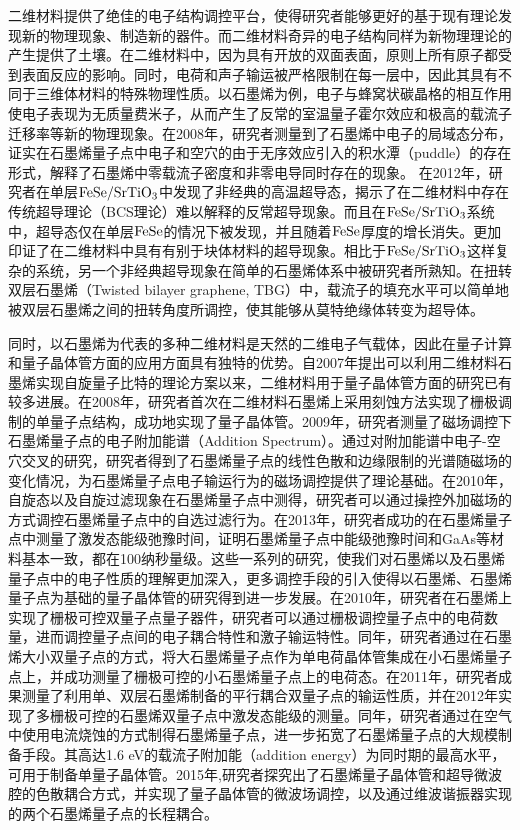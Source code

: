 二维材料提供了绝佳的电子结构调控平台，使得研究者能够更好的基于现有理论发现新的物理现象、制造新的器件。而二维材料奇异的电子结构同样为新物理理论的产生提供了土壤。在二维材料中，因为具有开放的双面表面，原则上所有原子都受到表面反应的影响。同时，电荷和声子输运被严格限制在每一层中，因此其具有不同于三维体材料的特殊物理性质。以石墨烯为例，电子与蜂窝状碳晶格的相互作用使电子表现为无质量费米子，从而产生了反常的室温量子霍尔效应和极高的载流子迁移率等新的物理现象。在2008年，研究者测量到了石墨烯中电子的局域态分布，证实在石墨烯量子点中电子和空穴的由于无序效应引入的积水潭（puddle）的存在形式，解释了石墨烯中零载流子密度和非零电导同时存在的现象。%
在2012年，研究者在单层$\rm{FeSe/SrTiO_{3}}$中发现了非经典的高温超导态，揭示了在二维材料中存在传统超导理论（BCS理论）难以解释的反常超导现象。而且在$\rm{FeSe/SrTiO_{3}}$系统中，超导态仅在单层$\rm{FeSe}$的情况下被发现，并且随着$\rm{FeSe}$厚度的增长消失。更加印证了在二维材料中具有有别于块体材料的超导现象。相比于$\rm{FeSe/SrTiO_{3}}$这样复杂的系统，另一个非经典超导现象在简单的石墨烯体系中被研究者所熟知。在扭转双层石墨烯（Twisted bilayer graphene, TBG）中，载流子的填充水平可以简单地被双层石墨烯之间的扭转角度所调控，使其能够从莫特绝缘体转变为超导体。

同时，以石墨烯为代表的多种二维材料是天然的二维电子气载体，因此在量子计算和量子晶体管方面的应用方面具有独特的优势。自2007年提出可以利用二维材料石墨烯实现自旋量子比特的理论方案以来，二维材料用于量子晶体管方面的研究已有较多进展。在2008年，研究者首次在二维材料石墨烯上采用刻蚀方法实现了栅极调制的单量子点结构，成功地实现了量子晶体管。2009年，研究者测量了磁场调控下石墨烯量子点的电子附加能谱（Addition Spectrum）。通过对附加能谱中电子-空穴交叉的研究，研究者得到了石墨烯量子点的线性色散和边缘限制的光谱随磁场的变化情况，为石墨烯量子点电子输运行为的磁场调控提供了理论基础。在2010年，自旋态以及自旋过滤现象在石墨烯量子点中测得，研究者可以通过操控外加磁场的方式调控石墨烯量子点中的自选过滤行为。在2013年，研究者成功的在石墨烯量子点中测量了激发态能级弛豫时间，证明石墨烯量子点中能级弛豫时间和GaAs等材料基本一致，都在100纳秒量级。这些一系列的研究，使我们对石墨烯以及石墨烯量子点中的电子性质的理解更加深入，更多调控手段的引入使得以石墨烯、石墨烯量子点为基础的量子晶体管的研究得到进一步发展。在2010年，研究者在石墨烯上实现了栅极可控双量子点量子器件，研究者可以通过栅极调控量子点中的电荷数量，进而调控量子点间的电子耦合特性和激子输运特性。同年，研究者通过在石墨烯大小双量子点的方式，将大石墨烯量子点作为单电荷晶体管集成在小石墨烯量子点上，并成功测量了栅极可控的小石墨烯量子点上的电荷态。在2011年，研究者成果测量了利用单、双层石墨烯制备的平行耦合双量子点的输运性质，并在2012年实现了多栅极可控的石墨烯双量子点中激发态能级的测量。同年，研究者通过在空气中使用电流烧蚀的方式制得石墨烯量子点，进一步拓宽了石墨烯量子点的大规模制备手段。其高达1.6 eV的载流子附加能（addition energy）为同时期的最高水平，可用于制备单量子晶体管。2015年,研究者探究出了石墨烯量子晶体管和超导微波腔的色散耦合方式，并实现了量子晶体管的微波场调控，以及通过维波谐振器实现的两个石墨烯量子点的长程耦合。

